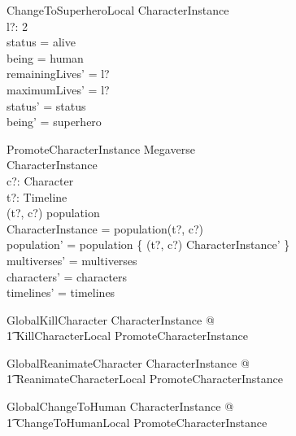 \documentclass{article}
\begin{document}
\begin{schema}{ChangeToSuperheroLocal}
\Delta CharacterInstance \\
l?: 2  \\
\where
status = alive \\
being = human \\
remainingLives' = l? \\
maximumLives' = l? \\
status' = status \\
being' = superhero \\
\end{schema}

\begin{schema}{PromoteCharacterInstance}
\Delta Megaverse \\
\Delta CharacterInstance \\
c?: Character \\
t?: Timeline \\ 
\where 
(t?, c?) \in \dom population \\ 
\theta CharacterInstance = population(t?, c?) \\
population' = population \oplus \{ (t?, c?) \mapsto \theta CharacterInstance' \}   \\
multiverses' = multiverses \\
characters' = characters \\
timelines' = timelines \\
\end{schema}

\begin{zed}
GlobalKillCharacter  \exists \Delta CharacterInstance @ \\
\t1 KillCharacterLocal \land PromoteCharacterInstance \\
\end{zed}

\begin{zed}
GlobalReanimateCharacter  \exists \Delta CharacterInstance @ \\
\t1 ReanimateCharacterLocal \land PromoteCharacterInstance \\
\end{zed}

\begin{zed}
GlobalChangeToHuman  \exists \Delta CharacterInstance @ \\ 
\t1 ChangeToHumanLocal \land PromoteCharacterInstance \\
\end{zed}
\end{document}
